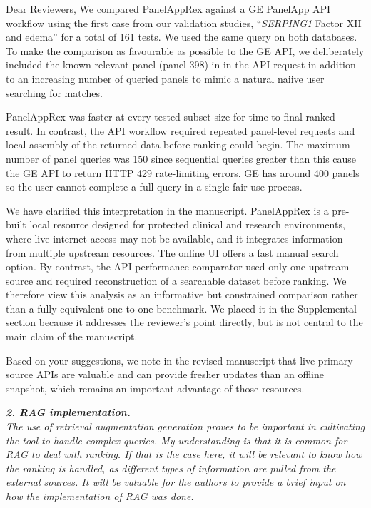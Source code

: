 \documentclass[12pt,a4paper]{letter}
\begin{document}
\begin{letter}{Dear Reviewers,}
We compared PanelAppRex against a GE PanelApp API workflow using the first case from our validation studies, ``\textit{SERPING1} Factor XII and edema'' for a total of 161 tests. We used the same query on both databases. To make the comparison as favourable as possible to the GE API, we deliberately included the known relevant panel (panel 398) in in the API request in addition to an increasing number of queried panels to mimic a natural naiive user searching for matches.

PanelAppRex was faster at every tested subset size for time to final ranked result. In contrast, the API workflow required repeated panel-level requests and local assembly of the returned data before ranking could begin. The maximum number of panel queries was 150 since sequential queries greater than this cause the GE API to return HTTP 429 rate-limiting errors. 
GE has around 400 panels so the user cannot complete a full query in a single fair-use process.

We have clarified this interpretation in the manuscript. PanelAppRex is a pre-built local resource designed for protected clinical and research environments, where live internet access may not be available, and it integrates information from multiple upstream resources. The online UI offers a fast manual search option. By contrast, the API performance comparator used only one upstream source and required reconstruction of a searchable dataset before ranking. We therefore view this analysis as an informative but constrained comparison rather than a fully equivalent one-to-one benchmark. We placed it in the Supplemental section because it addresses the reviewer’s point directly, but is not central to the main claim of the manuscript. 

Based on your suggestions, we note in the revised manuscript that live primary-source APIs are valuable and can provide fresher updates than an offline snapshot, which remains an important advantage of those resources.

\textit{\textbf{2. RAG implementation.}\\
The use of retrieval augmentation generation proves to be important in cultivating the tool to handle complex queries. My understanding is that it is common for RAG to deal with ranking. If that is the case here, it will be relevant to know how the ranking is handled, as different types of information are pulled from the external sources. It will be valuable for the authors to provide a brief input on how the implementation of RAG was done.}


\end{letter}
\end{document}
